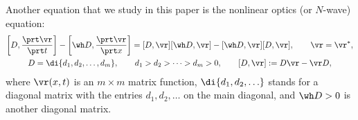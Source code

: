 Another equation that we study in this paper is the nonlinear optics (or $N$-wave) equation:
\begin{gather} \label{NW1}
\left[D, \frac{\prt \vr}{\prt t} \right] - \left[\wh D, \frac{\prt \vr}{\prt x} \right]
=
[D, \vr] [\wh D, \vr] - [\wh D, \vr] [ D, \vr], \qquad \vr=\vr^*, \\
\label{NW2} D=
\di \{ d_1,  d_2, \ldots,
 d_m \}, \qquad d_1>d_2>\cdots>d_m>0, \qquad [D,\vr]:=D\vr-\vr D,
\end{gather}
where $\vr(x,t)$ is an $m\times m$ matrix function, $\di \{ d_1, d_2, \ldots \}$ stands for a diagonal matrix with the
entries $d_1, d_2, \dots$ on the main diagonal, and $\wh D>0$ is another diagonal matrix.
